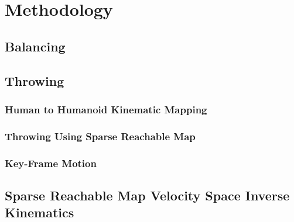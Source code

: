 \chapter{Methodology}


\section{Balancing}\label{sec:sec:balance}
	




\section{Throwing}\label{sec:baseball}
	

	\subsection{Human to Humanoid Kinematic Mapping}\label{sec:sec:mocap}
		

	\subsection{Throwing Using Sparse Reachable Map}\label{sec:sec:srm}
		

	\subsection{Key-Frame Motion}\label{sec:sec:keyframe}
		

\section{Sparse Reachable Map Velocity Space Inverse Kinematics}\label{sec:srm}
		
		
		
